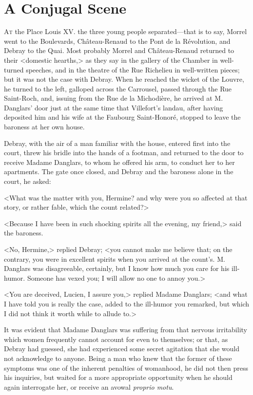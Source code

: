 \chapter{A Conjugal Scene} 

 \lettrine{A}{t} the Place Louis XV. the three young people separated—that is to say, Morrel went to the Boulevards, Château-Renaud to the Pont de la Révolution, and Debray to the Quai. Most probably Morrel and Château-Renaud returned to their <domestic hearths,> as they say in the gallery of the Chamber in well-turned speeches, and in the theatre of the Rue Richelieu in well-written pieces; but it was not the case with Debray. When he reached the wicket of the Louvre, he turned to the left, galloped across the Carrousel, passed through the Rue Saint-Roch, and, issuing from the Rue de la Michodière, he arrived at M. Danglars' door just at the same time that Villefort's landau, after having deposited him and his wife at the Faubourg Saint-Honoré, stopped to leave the baroness at her own house. 

 Debray, with the air of a man familiar with the house, entered first into the court, threw his bridle into the hands of a footman, and returned to the door to receive Madame Danglars, to whom he offered his arm, to conduct her to her apartments. The gate once closed, and Debray and the baroness alone in the court, he asked: 

 <What was the matter with you, Hermine? and why were you so affected at that story, or rather fable, which the count related?> 

 <Because I have been in such shocking spirits all the evening, my friend,> said the baroness. 

 <No, Hermine,> replied Debray; <you cannot make me believe that; on the contrary, you were in excellent spirits when you arrived at the count's. M. Danglars was disagreeable, certainly, but I know how much you care for his ill-humor. Someone has vexed you; I will allow no one to annoy you.> 

 <You are deceived, Lucien, I assure you,> replied Madame Danglars; <and what I have told you is really the case, added to the ill-humor you remarked, but which I did not think it worth while to allude to.> 

 It was evident that Madame Danglars was suffering from that nervous irritability which women frequently cannot account for even to themselves; or that, as Debray had guessed, she had experienced some secret agitation that she would not acknowledge to anyone. Being a man who knew that the former of these symptoms was one of the inherent penalties of womanhood, he did not then press his inquiries, but waited for a more appropriate opportunity when he should again interrogate her, or receive an avowal \textit{proprio motu}. 

